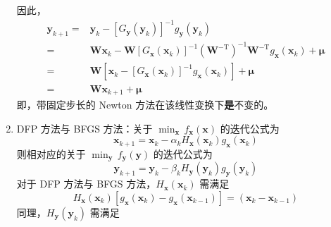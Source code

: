 \documentclass[cn,mtpro2,12pt]{elegantbook}
\begin{document}
\begin{solution}
\begin{enumerate}
\begin{equation}
              \end{equation}
              因此，
              \begin{equation}
                  \begin{aligned}
                      \mathbf{y}_{k+1}= & \mathbf{y}_{k}-\left[G_{\mathbf{y}}(\mathbf{y}_{k})\right]^{-1}g_{\mathbf{y}}(\mathbf{y}_{k})                                                                                                        \\
                      =                 & \mathbf{W}\mathbf{x}_{k}-\mathbf{W}\left[G_{\mathbf{x}}(\mathbf{x}_{k})\right]^{-1}\left(\mathbf{W}^{-\mathrm{T}}\right)^{-1}\mathbf{W}^{-\mathrm{T}}g_{\mathbf{x}}(\mathbf{x}_{k})+\boldsymbol{\mu} \\
                      =                 & \mathbf{W}\left[\mathbf{x}_{k}-\left[G_{\mathbf{x}}(\mathbf{x}_{k})\right]^{-1}g_{\mathbf{x}}(\mathbf{x}_{k})\right]+\boldsymbol{\mu}                                                                \\
                      =                 & \mathbf{W}\mathbf{x}_{k+1}+\boldsymbol{\mu}
                  \end{aligned}
              \end{equation}
              即，带固定步长的 Newton 方法在该线性变换下\textbf{是}不变的。
        \item DFP 方法与 BFGS 方法：关于 $\min_{\mathbf{x}}\,f_{\mathbf{x}}(\mathbf{x})$ 的迭代公式为
              \begin{equation}
                  \mathbf{x}_{k+1}=\mathbf{x}_{k}-\alpha_{k}H_{\mathbf{x}}(\mathbf{x}_{k})g_{\mathbf{x}}(\mathbf{x}_{k})
              \end{equation}
              则相对应的关于 $\min_{\mathbf{y}}\,f_{\mathbf{y}}(\mathbf{y})$ 的迭代公式为
              \begin{equation}
                  \mathbf{y}_{k+1}=\mathbf{y}_{k}-\beta_{k}H_{\mathbf{y}}(\mathbf{y}_{k})g_{\mathbf{y}}(\mathbf{y}_{k})
              \end{equation}
              对于 DFP 方法与 BFGS 方法，$H_{\mathbf{x}}(\mathbf{x}_{k})$ 需满足
              \begin{equation}
                  H_{\mathbf{x}}(\mathbf{x}_{k})\left[g_{\mathbf{x}}(\mathbf{x}_{k})-g_{\mathbf{x}}(\mathbf{x}_{k-1})\right]=\left(\mathbf{x}_{k}-\mathbf{x}_{k-1}\right)
              \end{equation}
              同理，$H_{\mathbf{y}}(\mathbf{y}_{k})$ 需满足
              \begin{equation}

\end{equation}
\end{enumerate}
\end{solution}
\end{document}

